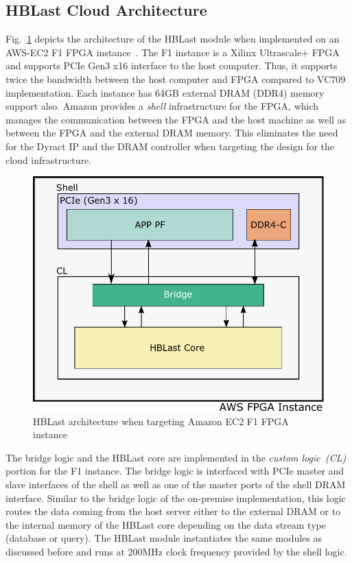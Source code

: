 \subsection{HBLast Cloud Architecture}
Fig.~\ref{fig:awsArch} depicts the architecture of the HBLast module when implemented on an AWS-EC2 F1 FPGA instance~\cite{aws2018}.
The F1 instance is a Xilinx Ultrascale+ FPGA and supports PCIe Gen3 x16 interface to the host computer.
Thus, it supports twice the bandwidth between the host computer and FPGA compared to VC709 implementation.
Each instance has 64GB external DRAM (DDR4) memory support also.
Amazon provides a \emph{shell} infrastructure for the FPGA, which manages the communication between the FPGA and the host machine as well as between the FPGA and the external DRAM memory.
This eliminates the need for the Dyract IP and the DRAM controller when targeting the design for the cloud infrastructure.


\begin{figure}[t!]
\centering
\includegraphics[width=0.9\columnwidth]{Figures/AwsArch.pdf}
\caption{HBLast architecture when targeting Amazon EC2 F1 FPGA instance} \label{fig:awsArch}
\end{figure}


The bridge logic and the HBLast core are implemented in the \emph{custom logic~(CL)} portion for the F1 instance.
The bridge logic is interfaced with PCIe master and slave interfaces of the shell as well as one of the master ports of the shell DRAM interface.
Similar to the bridge logic of the on-premise implementation, this logic routes the data coming from the host server either to the external DRAM or to the internal memory of the HBLast core depending on the data stream type (database or query).  
The HBLast module instantiates the same modules as discussed before and runs at 200MHz clock frequency provided by the shell logic.
